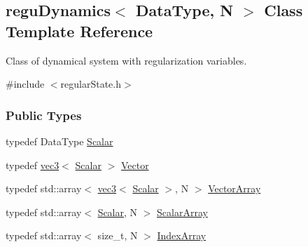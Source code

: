 \hypertarget{classregu_dynamics}{}\subsection{regu\+Dynamics$<$ Data\+Type, N $>$ Class Template Reference}
\label{classregu_dynamics}


Class of dynamical system with regularization variables.  




{\ttfamily \#include $<$regular\+State.\+h$>$}

\subsubsection*{Public Types}
\begin{DoxyCompactItemize}
\item 
typedef Data\+Type \mbox{\hyperlink{classregu_dynamics_a359c55370b4dee032396f0df86ad5fab}{Scalar}}
\item 
typedef \mbox{\hyperlink{structvec3}{vec3}}$<$ \mbox{\hyperlink{classregu_dynamics_a359c55370b4dee032396f0df86ad5fab}{Scalar}} $>$ \mbox{\hyperlink{classregu_dynamics_a454c165b5e838c6b44a3f18d6722a9e2}{Vector}}
\item 
typedef std\+::array$<$ \mbox{\hyperlink{structvec3}{vec3}}$<$ \mbox{\hyperlink{classregu_dynamics_a359c55370b4dee032396f0df86ad5fab}{Scalar}} $>$, N $>$ \mbox{\hyperlink{classregu_dynamics_a86a05253d927e1716f3401e887aa5c8e}{Vector\+Array}}
\item 
typedef std\+::array$<$ \mbox{\hyperlink{classregu_dynamics_a359c55370b4dee032396f0df86ad5fab}{Scalar}}, N $>$ \mbox{\hyperlink{classregu_dynamics_a34b4b77ea3e49e1cdef584ec8bd281dc}{Scalar\+Array}}
\item 
typedef std\+::array$<$ size\+\_\+t, N $>$ \mbox{\hyperlink{classregu_dynamics_a2c9fa7372e4a11be9d85728b4a0e455f}{Index\+Array}}
\end{DoxyCompactItemize}
